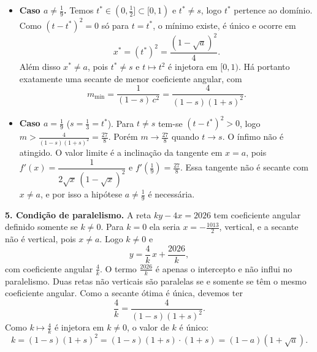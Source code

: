 \documentclass{article}%
\begin{document}
\begin{itemize}
\item \textbf{Caso $a\neq\frac19$.} Temos $t^*\in(0,\frac12]\subset[0,1)$ e $t^*\neq s$, logo $t^*$ pertence ao domínio. Como $(t-t^*)^2=0$ só para $t=t^*$, o mínimo existe, é único e ocorre em
\[
x^*=(t^*)^2=\frac{(1-\sqrt{a})^2}{4}.
\]
Além disso $x^*\neq a$, pois $t^*\neq s$ e $t\mapsto t^2$ é injetora em $[0,1)$. Há portanto exatamente uma secante de menor coeficiente angular, com
\[
m_{\min}=\frac{1}{(1-s)\,c^2}=\frac{4}{(1-s)(1+s)^2}.
\]
\item \textbf{Caso $a=\frac19$} ($s=\frac13=t^*$). Para $t\neq s$ tem-se $(t-t^*)^2>0$, logo $m>\frac{4}{(1-s)(1+s)^2}=\frac{27}{8}$. Porém $m\to\frac{27}{8}$ quando $t\to s$. O ínfimo não é atingido. O valor limite é a inclinação da tangente em $x=a$, pois $f'(x)=\dfrac{1}{2\sqrt{x}\,(1-\sqrt{x})^2}$ e $f'\left(\frac{1}{9}\right)=\frac{27}{8}$. Essa tangente não é secante com $x\neq a$, e por isso a hipótese $a\neq\frac19$ é necessária.
\end{itemize}

\textbf{5. Condição de paralelismo.} A reta $ky-4x=2026$ tem coeficiente angular definido somente se $k\neq 0$. Para $k=0$ ela seria $x=-\frac{1013}{2}$, vertical, e a secante não é vertical, pois $x\neq a$. Logo $k\neq 0$ e
\[
y=\frac{4}{k}\,x+\frac{2026}{k},
\]
com coeficiente angular $\frac{4}{k}$. O termo $\frac{2026}{k}$ é apenas o intercepto e não influi no paralelismo. Duas retas não verticais são paralelas se e somente se têm o mesmo coeficiente angular. Como a secante ótima é única, devemos ter
\[
\frac{4}{k}=\frac{4}{(1-s)(1+s)^2}.
\]
Como $k\mapsto\frac4k$ é injetora em $k\neq0$, o valor de $k$ é único:
\[
k=(1-s)(1+s)^2=(1-s)(1+s)\cdot(1+s)=(1-a)(1+\sqrt{a}).
\]
\end{document}
